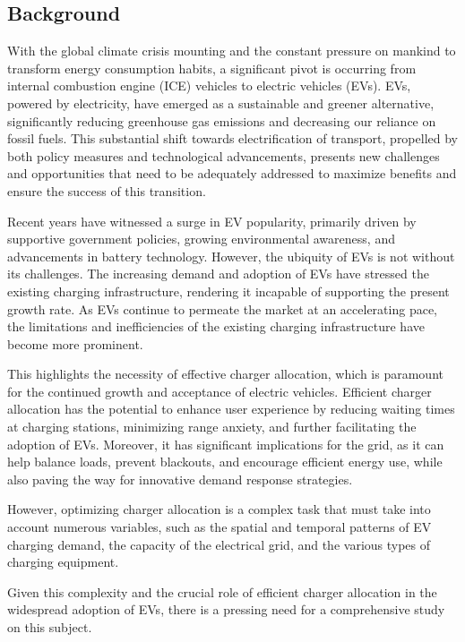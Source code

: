 
\subsection{Background}

With the global climate crisis mounting and the constant pressure on mankind to transform energy consumption habits, a significant pivot is occurring from internal combustion engine (ICE) vehicles to electric vehicles (EVs). EVs, powered by electricity, have emerged as a sustainable and greener alternative, significantly reducing greenhouse gas emissions and decreasing our reliance on fossil fuels. This substantial shift towards electrification of transport, propelled by both policy measures and technological advancements, presents new challenges and opportunities that need to be adequately addressed to maximize benefits and ensure the success of this transition.

Recent years have witnessed a surge in EV popularity, primarily driven by supportive government policies, growing environmental awareness, and advancements in battery technology. However, the ubiquity of EVs is not without its challenges. The increasing demand and adoption of EVs have stressed the existing charging infrastructure, rendering it incapable of supporting the present growth rate. As EVs continue to permeate the market at an accelerating pace, the limitations and inefficiencies of the existing charging infrastructure have become more prominent.

This highlights the necessity of effective charger allocation, which is paramount for the continued growth and acceptance of electric vehicles. Efficient charger allocation has the potential to enhance user experience by reducing waiting times at charging stations, minimizing range anxiety, and further facilitating the adoption of EVs. Moreover, it has significant implications for the grid, as it can help balance loads, prevent blackouts, and encourage efficient energy use, while also paving the way for innovative demand response strategies.

However, optimizing charger allocation is a complex task that must take into account numerous variables, such as the spatial and temporal patterns of EV charging demand, the capacity of the electrical grid, and the various types of charging equipment. 

Given this complexity and the crucial role of efficient charger allocation in the widespread adoption of EVs, there is a pressing need for a comprehensive study on this subject. 

